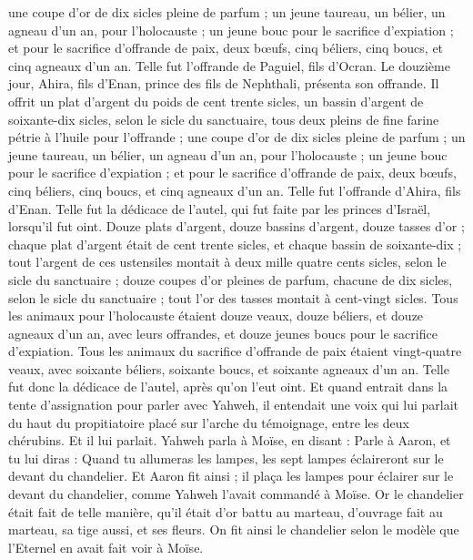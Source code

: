 \begin{multicols}{2}
une coupe d'or de dix sicles pleine de parfum ;
un jeune taureau, un bélier, un agneau d'un an, pour l'holocauste ;
un jeune bouc pour le sacrifice d'expiation ;
et pour le sacrifice d'offrande de paix, deux bœufs, cinq béliers, cinq boucs, et cinq agneaux d'un an. Telle fut l'offrande de Paguiel, fils d'Ocran.
Le douzième jour, Ahira, fils d'Enan, prince des fils de Nephthali, présenta son offrande.
Il offrit un plat d'argent du poids de cent trente sicles, un bassin d'argent de soixante-dix sicles, selon le sicle du sanctuaire, tous deux pleins de fine farine pétrie à l'huile pour l'offrande ;
une coupe d'or de dix sicles pleine de parfum ;
un jeune taureau, un bélier, un agneau d'un an, pour l'holocauste ;
un jeune bouc pour le sacrifice d'expiation ;
et pour le sacrifice d'offrande de paix, deux bœufs, cinq béliers, cinq boucs, et cinq agneaux d'un an. Telle fut l'offrande d'Ahira, fils d'Enan.
Telle fut la dédicace de l'autel, qui fut faite par les princes d'Israël, lorsqu'il fut oint. Douze plats d'argent, douze bassins d'argent, douze tasses d'or ;
chaque plat d'argent était de cent trente sicles, et chaque bassin de soixante-dix ; tout l'argent de ces ustensiles montait à deux mille quatre cents sicles, selon le sicle du sanctuaire ;
douze coupes d'or pleines de parfum, chacune de dix sicles, selon le sicle du sanctuaire ; tout l'or des tasses montait à cent-vingt sicles.
Tous les animaux pour l'holocauste étaient douze veaux, douze béliers, et douze agneaux d'un an, avec leurs offrandes, et douze jeunes boucs pour le sacrifice d'expiation.
Tous les animaux du sacrifice d'offrande de paix étaient vingt-quatre veaux, avec soixante béliers, soixante boucs, et soixante agneaux d'un an. Telle fut donc la dédicace de l'autel, après qu'on l'eut oint.
Et quand entrait dans la tente d'assignation pour parler avec Yahweh, il entendait une voix qui lui parlait du haut du propitiatoire placé sur l'arche du témoignage, entre les deux chérubins. Et il lui parlait.
\VerseOne{}Yahweh parla à Moïse, en disant :
Parle à Aaron, et tu lui diras : Quand tu allumeras les lampes, les sept lampes éclaireront sur le devant du chandelier.
Et Aaron fit ainsi ; il plaça les lampes pour éclairer sur le devant du chandelier, comme Yahweh l'avait commandé à Moïse.
Or le chandelier était fait de telle manière, qu'il était d'or battu au marteau, d'ouvrage fait au marteau, sa tige aussi, et ses fleurs. On fit ainsi le chandelier selon le modèle que l'Eternel en avait fait voir à Moïse.

\end{multicols}
